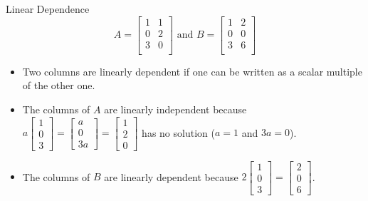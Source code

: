 \documentclass[aspectratio=43]{beamer}
\begin{document}
\begin{frame}{Linear Dependence}
  $$
    A = \begin{bmatrix}
      1 & 1 \\
      0 & 2 \\
      3 & 0 \\
    \end{bmatrix} \text{ and }
    B = \begin{bmatrix}
      1 & 2 \\
      0 & 0 \\
      3 & 6 \\
    \end{bmatrix}
  $$
  \begin{itemize}
    \item Two columns are \alert{linearly dependent} if one can be written as a scalar multiple of the other one.

    \item The columns of $A$ are linearly independent because $a \begin{bmatrix}1 \\ 0 \\ 3 \end{bmatrix} = \begin{bmatrix}a \\ 0 \\ 3a  \end{bmatrix} = \begin{bmatrix}1 \\ 2 \\ 0 \end{bmatrix}$ has no solution ($a = 1$ and $3a = 0$).

    \item The columns of $B$ are linearly dependent because $2 \begin{bmatrix}1 \\ 0 \\ 3\end{bmatrix} = \begin{bmatrix}2 \\ 0 \\ 6 \end{bmatrix}$.
  \end{itemize}
\end{frame}
\end{document}
